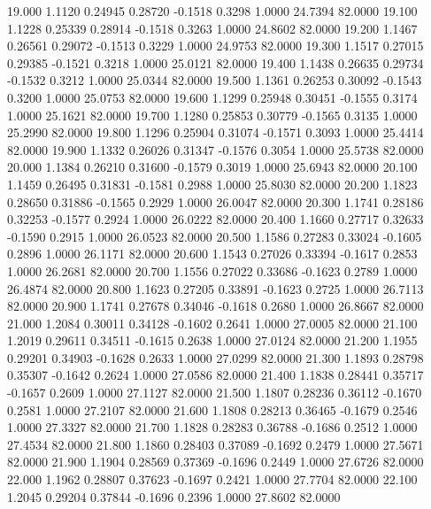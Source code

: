   19.000   1.1120   0.24945   0.28720  -0.1518   0.3298   1.0000  24.7394  82.0000
  19.100   1.1228   0.25339   0.28914  -0.1518   0.3263   1.0000  24.8602  82.0000
  19.200   1.1467   0.26561   0.29072  -0.1513   0.3229   1.0000  24.9753  82.0000
  19.300   1.1517   0.27015   0.29385  -0.1521   0.3218   1.0000  25.0121  82.0000
  19.400   1.1438   0.26635   0.29734  -0.1532   0.3212   1.0000  25.0344  82.0000
  19.500   1.1361   0.26253   0.30092  -0.1543   0.3200   1.0000  25.0753  82.0000
  19.600   1.1299   0.25948   0.30451  -0.1555   0.3174   1.0000  25.1621  82.0000
  19.700   1.1280   0.25853   0.30779  -0.1565   0.3135   1.0000  25.2990  82.0000
  19.800   1.1296   0.25904   0.31074  -0.1571   0.3093   1.0000  25.4414  82.0000
  19.900   1.1332   0.26026   0.31347  -0.1576   0.3054   1.0000  25.5738  82.0000
  20.000   1.1384   0.26210   0.31600  -0.1579   0.3019   1.0000  25.6943  82.0000
  20.100   1.1459   0.26495   0.31831  -0.1581   0.2988   1.0000  25.8030  82.0000
  20.200   1.1823   0.28650   0.31886  -0.1565   0.2929   1.0000  26.0047  82.0000
  20.300   1.1741   0.28186   0.32253  -0.1577   0.2924   1.0000  26.0222  82.0000
  20.400   1.1660   0.27717   0.32633  -0.1590   0.2915   1.0000  26.0523  82.0000
  20.500   1.1586   0.27283   0.33024  -0.1605   0.2896   1.0000  26.1171  82.0000
  20.600   1.1543   0.27026   0.33394  -0.1617   0.2853   1.0000  26.2681  82.0000
  20.700   1.1556   0.27022   0.33686  -0.1623   0.2789   1.0000  26.4874  82.0000
  20.800   1.1623   0.27205   0.33891  -0.1623   0.2725   1.0000  26.7113  82.0000
  20.900   1.1741   0.27678   0.34046  -0.1618   0.2680   1.0000  26.8667  82.0000
  21.000   1.2084   0.30011   0.34128  -0.1602   0.2641   1.0000  27.0005  82.0000
  21.100   1.2019   0.29611   0.34511  -0.1615   0.2638   1.0000  27.0124  82.0000
  21.200   1.1955   0.29201   0.34903  -0.1628   0.2633   1.0000  27.0299  82.0000
  21.300   1.1893   0.28798   0.35307  -0.1642   0.2624   1.0000  27.0586  82.0000
  21.400   1.1838   0.28441   0.35717  -0.1657   0.2609   1.0000  27.1127  82.0000
  21.500   1.1807   0.28236   0.36112  -0.1670   0.2581   1.0000  27.2107  82.0000
  21.600   1.1808   0.28213   0.36465  -0.1679   0.2546   1.0000  27.3327  82.0000
  21.700   1.1828   0.28283   0.36788  -0.1686   0.2512   1.0000  27.4534  82.0000
  21.800   1.1860   0.28403   0.37089  -0.1692   0.2479   1.0000  27.5671  82.0000
  21.900   1.1904   0.28569   0.37369  -0.1696   0.2449   1.0000  27.6726  82.0000
  22.000   1.1962   0.28807   0.37623  -0.1697   0.2421   1.0000  27.7704  82.0000
  22.100   1.2045   0.29204   0.37844  -0.1696   0.2396   1.0000  27.8602  82.0000
